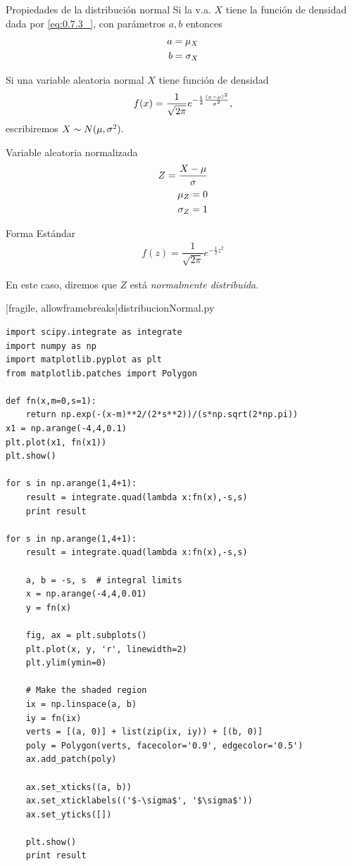 {Propiedades de la distribución normal}
 Si la v.a. $X$ tiene la función de densidad dada por \eqref{eq:0.7.3_}, con parámetros $a,b$ entonces
 \begin{align}
  a = \mu_{X}\\
  b = \sigma_{X}
 \end{align}



 Si una variable aleatoria normal $X$ tiene función de densidad
  \begin{align}
  \label{eq:0.7.3_}
  f(x)=\dfrac{1}{\sqrt{2\pi}}e^{-\frac{1}{2}\frac{(x-\mu)^{2}}{\sigma^{2}}},
 \end{align}
 escribiremos $X\sim N(\mu, \sigma^{2}).$


{Variable aleatoria normalizada}
 \begin{align}
  \label{eq:0.7.va}
  Z = \dfrac{X-\mu}{\sigma}\\
  \mu_{Z}=0 \\
  \sigma_{Z}=1
 \end{align}


{Forma Estándar}
 \begin{align}
  \label{eq:0.7.4}
  f(z)=\dfrac{1}{\sqrt{2\pi}}e^{-\frac{1}{2}z^{2}}
 \end{align}


En este caso, diremos que $Z$ está \emph{normalmente distribuida.}


[fragile, allowframebreaks]{distribucionNormal.py}
 \begin{verbatim}
import scipy.integrate as integrate
import numpy as np
import matplotlib.pyplot as plt
from matplotlib.patches import Polygon

def fn(x,m=0,s=1):
    return np.exp(-(x-m)**2/(2*s**2))/(s*np.sqrt(2*np.pi))
x1 = np.arange(-4,4,0.1)
plt.plot(x1, fn(x1))
plt.show()

for s in np.arange(1,4+1):
    result = integrate.quad(lambda x:fn(x),-s,s)
    print result

for s in np.arange(1,4+1):
    result = integrate.quad(lambda x:fn(x),-s,s)

    a, b = -s, s  # integral limits
    x = np.arange(-4,4,0.01)
    y = fn(x)

    fig, ax = plt.subplots()
    plt.plot(x, y, 'r', linewidth=2)
    plt.ylim(ymin=0)

    # Make the shaded region
    ix = np.linspace(a, b)
    iy = fn(ix)
    verts = [(a, 0)] + list(zip(ix, iy)) + [(b, 0)]
    poly = Polygon(verts, facecolor='0.9', edgecolor='0.5')
    ax.add_patch(poly)

    ax.set_xticks((a, b))
    ax.set_xticklabels(('$-\sigma$', '$\sigma$'))
    ax.set_yticks([])

    plt.show()
    print result
 \end{verbatim}



